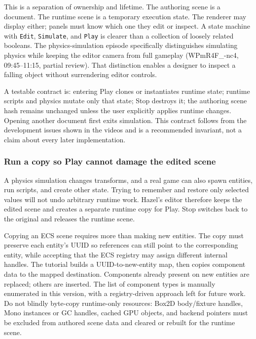 This is a separation of ownership and lifetime. The authoring scene is a document. The runtime scene is a temporary execution state. The renderer may display either; panels must know which one they edit or inspect. A state machine with \texttt{Edit}, \texttt{Simulate}, and \texttt{Play} is clearer than a collection of loosely related booleans. The physics-simulation episode specifically distinguishes simulating physics while keeping the editor camera from full gameplay (WPmR4F\_-nc4, 09:45--11:15, partial review). That distinction enables a designer to inspect a falling object without surrendering editor controls.

A testable contract is: entering Play clones or instantiates runtime state; runtime scripts and physics mutate only that state; Stop destroys it; the authoring scene hash remains unchanged unless the user explicitly applies runtime changes. Opening another document first exits simulation. This contract follows from the development issues shown in the videos and is a recommended invariant, not a claim about every later implementation.

\subsubsection{Run a copy so Play cannot damage the edited scene}\label{06-engine-ii-ch033-run-a-copy-so-play-cannot-damage-the-edited-scene}

A physics simulation changes transforms, and a real game can also spawn entities, run scripts, and create other state. Trying to remember and restore only selected values will not undo arbitrary runtime work. Hazel's editor therefore keeps the edited scene and creates a separate runtime copy for Play. Stop switches back to the original and releases the runtime scene.

Copying an ECS scene requires more than making new entities. The copy must preserve each entity's UUID so references can still point to the corresponding entity, while accepting that the ECS registry may assign different internal handles. The tutorial builds a UUID-to-new-entity map, then copies component data to the mapped destination. Components already present on new entities are replaced; others are inserted. The list of component types is manually enumerated in this version, with a registry-driven approach left for future work. Do not blindly byte-copy runtime-only resources: Box2D body/fixture handles, Mono instances or GC handles, cached GPU objects, and backend pointers must be excluded from authored scene data and cleared or rebuilt for the runtime scene.


